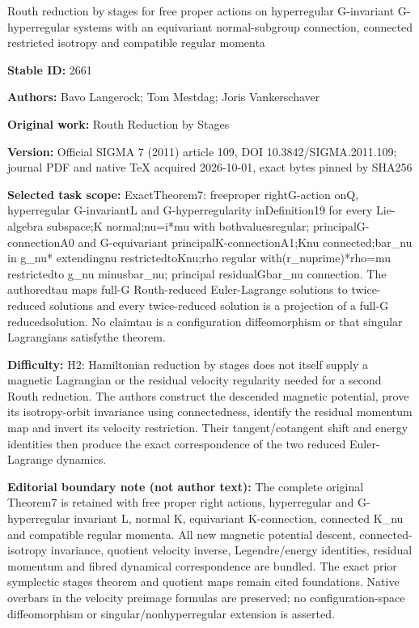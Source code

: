 \documentclass[11pt]{article}
\begin{document}
\begin{center}\Large Routh reduction by stages for free proper actions on hyperregular G-invariant G-hyperregular systems with an equivariant normal-subgroup connection, connected restricted isotropy and compatible regular momenta\end{center}
\noindent\textbf{Stable ID:} 2661\par
\noindent\textbf{Authors:} Bavo Langerock; Tom Mestdag; Joris Vankerschaver\par
\noindent\textbf{Original work:} Routh Reduction by Stages\par
\noindent\textbf{Version:} Official SIGMA 7 (2011) article 109, DOI 10.3842/SIGMA.2011.109; journal PDF and native TeX acquired 2026-10-01, exact bytes pinned by SHA256\par
\noindent\textbf{Selected task scope:} ExactTheorem7: freeproper rightG-action onQ, hyperregular G-invariantL and G-hyperregularity inDefinition19 for every Lie-algebra subspace;K normal;nu=\allowbreak{}i*\allowbreak{}mu with bothvaluesregular; principalG-connectionA0 and G-equivariant principalK-connectionA1;Knu connected;bar\_nu in g\_nu*\allowbreak{} extendingnu restrictedtoKnu;rho regular with(r\_nuprime)*\allowbreak{}rho=\allowbreak{}mu restrictedto g\_nu minusbar\_nu; principal residualGbar\_nu connection. The authoredtau maps full-G Routh-reduced Euler-Lagrange solutions to twice-reduced solutions and every twice-reduced solution is a projection of a full-G reducedsolution. No claimtau is a configuration diffeomorphism or that singular Lagrangians satisfythe theorem.\par
\noindent\textbf{Difficulty:} H2: Hamiltonian reduction by stages does not itself supply a magnetic Lagrangian or the residual velocity regularity needed for a second Routh reduction. The authors construct the descended magnetic potential, prove its isotropy-orbit invariance using connectedness, identify the residual momentum map and invert its velocity restriction. Their tangent/cotangent shift and energy identities then produce the exact correspondence of the two reduced Euler-Lagrange dynamics.\par
\noindent\textbf{Editorial boundary note (not author text):} The complete original Theorem7 is retained with free proper right actions, hyperregular and G-hyperregular invariant L, normal K, equivariant K-connection, connected K\_nu and compatible regular momenta. All new magnetic potential descent, connected-isotropy invariance, quotient velocity inverse, Legendre/energy identities, residual momentum and fibred dynamical correspondence are bundled. The exact prior symplectic stages theorem and quotient maps remain cited foundations. Native overbars in the velocity preimage formulas are preserved; no configuration-space diffeomorphism or singular/nonhyperregular extension is asserted.\par
\end{document}
